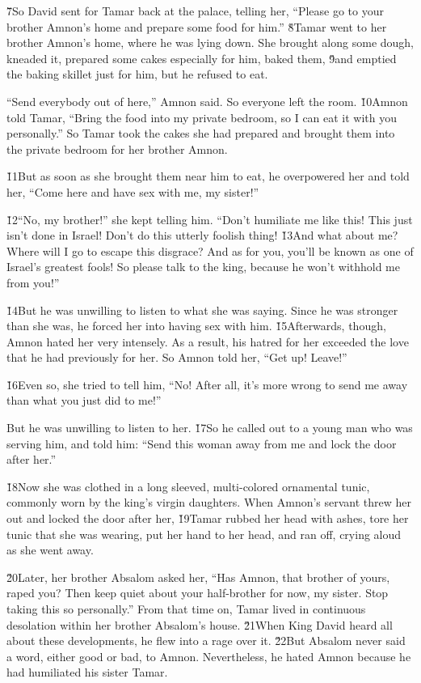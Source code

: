 \v{7}So David sent for Tamar back at the palace, telling her, ``Please go to your brother Amnon's home and prepare some food for him.'' \v{8}Tamar went to her brother Amnon's home, where he was lying down. She brought along some dough, kneaded it, prepared some cakes especially for him, baked them, \v{9}and emptied the baking skillet just for him, but he refused to eat.

``Send everybody out of here,'' Amnon said. So everyone left the room. \v{10}Amnon told Tamar, ``Bring the food into my private bedroom, so I can eat it with you personally.'' So Tamar took the cakes she had prepared and brought them into the private bedroom for her brother Amnon.

\v{11}But as soon as she brought them near him to eat, he overpowered her and told her, ``Come here and have sex with me, my sister!''

\v{12}``No, my brother!'' she kept telling him. ``Don't humiliate me like this! This just isn't done in Israel! Don't do this utterly foolish thing! \v{13}And what about me? Where will I go to escape this disgrace? And as for you, you'll be known as one of Israel's greatest fools! So please talk to the king, because he won't withhold me from you!''

\v{14}But he was unwilling to listen to what she was saying. Since he was stronger than she was, he forced her into having sex with him. \v{15}Afterwards, though, Amnon hated her very intensely. As a result, his hatred for her exceeded the love that he had previously for her. So Amnon told her, ``Get up! Leave!''

\v{16}Even so, she tried to tell him, ``No! After all, it's more wrong to send me away than what you just did to me!''

But he was unwilling to listen to her. \v{17}So he called out to a young man who was serving him, and told him: ``Send this woman away from me and lock the door after her.''

\v{18}Now she was clothed in a long sleeved, multi-colored ornamental tunic, commonly worn by the king's virgin daughters. When Amnon's servant threw her out and locked the door after her, \v{19}Tamar rubbed her head with ashes, tore her tunic that she was wearing, put her hand to her head, and ran off, crying aloud as she went away.

\v{20}Later, her brother Absalom asked her, ``Has Amnon, that brother of yours, raped you? Then keep quiet about your half-brother for now, my sister. Stop taking this so personally.'' From that time on, Tamar lived in continuous desolation within her brother Absalom's house. \v{21}When King David heard all about these developments, he flew into a rage over it. \v{22}But Absalom never said a word, either good or bad, to Amnon. Nevertheless, he hated Amnon because he had humiliated his sister Tamar.


